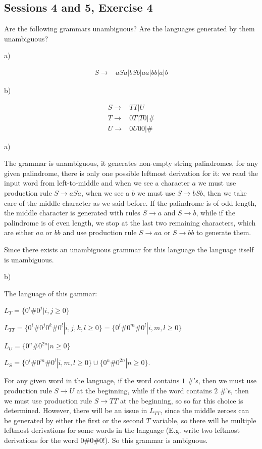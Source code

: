 \subsection{Sessions 4 and 5, Exercise 4}


Are the following grammars unambiguous? Are the languages generated by them unambiguous?

a)

\begin{align*}
S \rightarrow& aSa|bSb|aa|bb|a|b
\end{align*}

b)

\begin{align*}
S \rightarrow& TT|U \\
T \rightarrow& 0T|T0|\# \\
U \rightarrow& 0U00|\#
\end{align*}


a)

The grammar is unambiguous, it generates non-empty string palindromes, for any given palindrome, there is only one possible leftmost derivation for it: we read the input word from left-to-middle and when we see a character $a$ we must use production rule $S \rightarrow aSa$, when we see a $b$ we must use $S \rightarrow bSb$, then we take care of the middle character as we said before. If the palindrome is of odd length, the middle character is generated with rules $S \rightarrow a$ and $S \rightarrow b$, while if the palindrome is of even length, we stop at the last two remaining characters, which are either $aa$ or $bb$ and use production rule $S\rightarrow aa$ or $S\rightarrow bb$ to generate them. 

Since there exists an unambiguous grammar for this language the language itself is unambiguous.

b)

The language of this gammar:

$L_T = \{0^i\#0^j | i,j \geq{} 0\}$

$L_{TT} = \{0^i\#0^j0^k\#0^l | i,j,k,l \geq{} 0\} = \{0^i\#0^m\#0^l | i,m,l \geq{} 0\}$

$L_U = \{0^n\#0^{2n} | n\geq{} 0\}$

$L_S = \{0^i\#0^m\#0^l | i,m,l \geq{} 0\} \cup{} \{0^n\#0^{2n} | n\geq{} 0\}$.

For any given word in the language, if the word contains $1$ $\#$'s, then we must use production rule $S \rightarrow U$ at the beginning, while if the word contains $2$ $\#$'s, then we must use production rule $S \rightarrow TT$ at the beginning, so so far this choice is determined. However, there will be an issue in $L_{TT}$, since the middle zeroes can be generated by either the first or the second $T$ variable, so there will be multiple leftmost derivations for some words in the language (E.g. write two leftmost derivations for the word $0\#0\#0$!). So this grammar is ambiguous.

